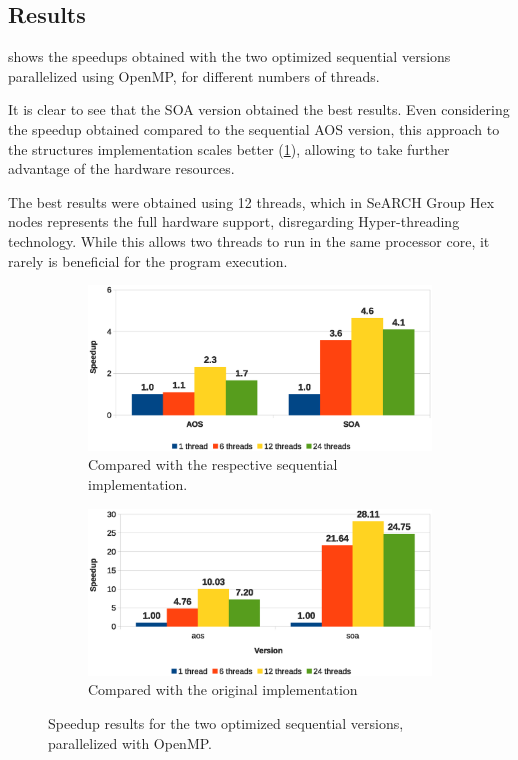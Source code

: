  \subsection{Results}

 shows the speedups obtained with the two optimized sequential versions parallelized using OpenMP, for different numbers of threads.

It is clear to see that the SOA version obtained the best results. Even considering the speedup obtained compared to the sequential AOS version, this approach to the structures implementation scales better (\cref{fig:results:omp:seq}), allowing to take further advantage of the hardware resources.

The best results were obtained using 12 threads, which in SeARCH Group Hex nodes represents the full hardware support, disregarding \intel Hyper-threading technology. While this allows two threads to run in the same processor core, it rarely is beneficial for the program execution.

\begin{figure}[!htp]
	\centering
	\begin{subfigure}[b]{\columnwidth}
		\includegraphics[width=\textwidth]{images/graph_comparison_omp.eps}
		\caption{Compared with the respective sequential implementation.}
		\label{fig:results:omp:seq}
	\end{subfigure}
	\begin{subfigure}[b]{\columnwidth}
		\includegraphics[width=\textwidth]{images/graph_comparison_omp_global.eps}
		\caption{Compared with the original implementation}
		\label{fig:results:omp:global}
	\end{subfigure}
	\caption{Speedup results for the two optimized sequential versions, parallelized with OpenMP.}
	\label{fig:results:omp}
\end{figure}
